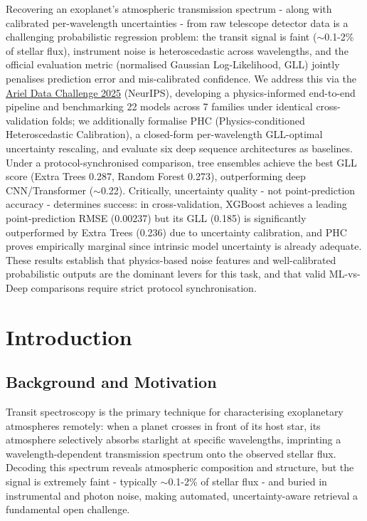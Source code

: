\documentclass[12pt]{article}
\begin{document}
Recovering an exoplanet's atmospheric transmission spectrum - along with calibrated per-wavelength uncertainties - from raw telescope detector data is a challenging probabilistic regression problem: the transit signal is faint ($\sim$0.1-2\% of stellar flux), instrument noise is heteroscedastic across wavelengths, and the official evaluation metric (normalised Gaussian Log-Likelihood, GLL) jointly penalises prediction error and mis-calibrated confidence. We address this via the \href{https://www.kaggle.com/competitions/ariel-data-challenge-2025}{Ariel Data Challenge 2025} (NeurIPS), developing a physics-informed end-to-end pipeline and benchmarking 22 models across 7 families under identical cross-validation folds; we additionally formalise PHC (Physics-conditioned Heteroscedastic Calibration), a closed-form per-wavelength GLL-optimal uncertainty rescaling, and evaluate six deep sequence architectures as baselines. Under a protocol-synchronised comparison, tree ensembles achieve the best GLL score (Extra Trees 0.287, Random Forest 0.273), outperforming deep CNN/Transformer ($\sim$0.22). Critically, uncertainty quality - not point-prediction accuracy - determines success: in cross-validation, XGBoost achieves a leading point-prediction RMSE (0.00237) but its GLL (0.185) is significantly outperformed by Extra Trees (0.236) due to uncertainty calibration, and PHC proves empirically marginal since intrinsic model uncertainty is already adequate. These results establish that physics-based noise features and well-calibrated probabilistic outputs are the dominant levers for this task, and that valid ML-vs-Deep comparisons require strict protocol synchronisation.

\section{Introduction}

\subsection{Background and Motivation}

Transit spectroscopy is the primary technique for characterising exoplanetary atmospheres remotely: when a planet crosses in front of its host star, its atmosphere selectively absorbs starlight at specific wavelengths, imprinting a wavelength-dependent transmission spectrum onto the observed stellar flux. Decoding this spectrum reveals atmospheric composition and structure, but the signal is extremely faint - typically $\sim$0.1-2\% of stellar flux - and buried in instrumental and photon noise, making automated, uncertainty-aware retrieval a fundamental open challenge.
\end{document}
